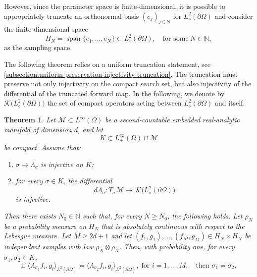 \documentclass[11pt,oneside]{amsart}
\theoremstyle{plain}
\newtheorem{theorem}{Theorem}[section]
\theoremstyle{definition}
\theoremstyle{remark}
\newtheorem{remark}[theorem]{Remark}
\newcommand{\NN}{\mathbb{N}}
\newcommand{\LDd}{L^2_\diamond(\partial\Omega)}
\newcommand{\calK}{\mathcal{K}}
\newcommand{\calM}{\mathcal{M}}
\begin{document}
However, since the parameter space is finite-dimensional, it is possible to appropriately truncate an orthonormal basis $(e_j)_{j\in\NN}$ for $L^2_\diamond(\partial\Omega)$ and consider the finite-dimensional space
\begin{equation}\label{eq HN}
    H_N=\operatorname{span}\{e_1,\dots,e_N\}\subset\LDd,\quad\text{for some}~N\in\NN,
\end{equation}
as the sampling space.

The following theorem relies on a uniform truncation statement, see \cref{subsection:uniform-preservation-injectivity-truncation}. The truncation must preserve not only injectivity on the compact search set, but also injectivity of the differential of the truncated forward map. In the following, we denote by $\calK\bigl(L^2_\diamond(\partial\Omega)\bigr)$ the set of compact operators acting between $L^2_\diamond(\partial\Omega)$ and itself.

\begin{theorem}\label{thm:calderon-finite}
Let $\calM\subset L^\infty(\Omega)$ be a second-countable embedded real-analytic manifold of dimension $d$, and let
\[
    K\subset L^\infty_+(\Omega)\cap\calM
\]
be compact. Assume that:
\begin{enumerate}[label=\textup{(\roman*)},leftmargin=*]
    \item $\sigma\mapsto\Lambda_\sigma$ is injective on $K$;
    \item for every $\sigma\in K$, the differential
    \[
        d\Lambda_\sigma\colon T_\sigma\calM\longrightarrow
        \calK\bigl(L^2_\diamond(\partial\Omega)\bigr)
    \]
    is injective.
\end{enumerate}
Then there exists $N_0\in\NN$ such that, for every $N\geq N_0$, the following holds. Let $\rho_N$ be a probability measure on $H_N$ that is absolutely continuous with respect to the Lebesgue measure. Let $M\geq2d+1$ and let $(f_1,g_1),\dots,(f_M,g_M)\in H_N\times H_N$ be independent samples with law $\rho_N\otimes\rho_N$. Then, with probability one, for every $\sigma_1,\sigma_2\in K$,
\[ \text{if }
   \langle\Lambda_{\sigma_1} f_i,g_i\rangle_{L^2(\partial\Omega)}=\langle\Lambda_{\sigma_2} f_i,g_i\rangle_{L^2(\partial\Omega)},\; \text{for } i=1,\dots,M,\quad \text{then } \sigma_1=\sigma_2.
\]
\end{theorem}

\end{document}
